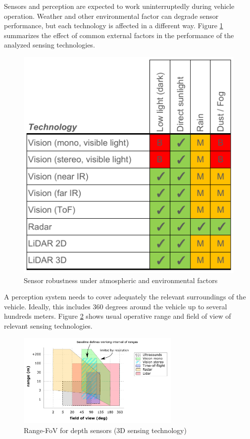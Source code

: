 Sensors and perception are expected to work uninterruptedly during vehicle 
operation. Weather and other environmental factor can degrade sensor
performance, but each technology is affected in a different way. 
Figure \ref{fig:sensors-environ} summarizes the effect of common external
factors in the performance of the analyzed sensing technologies.

\begin{figure}[h]
\centering
\includegraphics[width=0.68\linewidth]{"img/sensors_atmospheric_conditions"}
\caption{Sensor robustness under atmospheric and environmental factors}
\label{fig:sensors-environ}
\end{figure}

A perception system needs to cover adequately the relevant surroundings of the
vehicle. Ideally, this includes 360 degrees around the vehicle up to several
hundreds meters. Figure \ref{fig:range-fov} shows usual operative range and
field of view of relevant sensing technologies. 

\begin{figure}[h]
    \centering
    \includegraphics[width=0.7\textwidth]{"img/plot_range-fov"}
    \caption{Range-FoV for depth sensors (3D sensing technology)}
    \label{fig:range-fov}
\end{figure}

